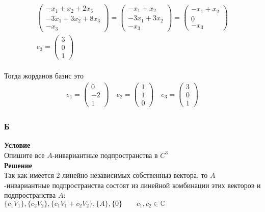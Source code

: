 \begin{gather*}
			\begin{pmatrix}
				-x_1 + x_2 + 2x_3\\
				-3x_1 + 3x_2 + 8x_3\\
				-x_3
			\end{pmatrix}
			= 
			\begin{pmatrix}
				-x_1 + x_2\\
				-3x_1 + 3x_2\\
				-x_3
			\end{pmatrix}
			= 
			\begin{pmatrix}
				-x_1 + x_2\\
				0\\
				-x_3
			\end{pmatrix}
			\\
			e_3 = 
			\begin{pmatrix}
				3 \\ 0 \\ 1
			\end{pmatrix}
		\end{gather*}
		\\
		Тогда жорданов базис это
		\begin{gather*}
			e_1 = 
			\begin{pmatrix}
				0 \\ -2 \\ 1
			\end{pmatrix}
			\quad
			e_2 = 
			\begin{pmatrix}
				1 \\ 1 \\ 0
			\end{pmatrix}
			\quad
			e_3 = 
			\begin{pmatrix}
				3 \\ 0 \\ 1
			\end{pmatrix}
		\end{gather*}
		
		\subsubsection*{\textbf{Б}}
		\textbf{Условие}\\
		 Опишите все $A$-инвариантные подпространства в $C^3$
		\\
		\textbf{Решение}\\
		Так как имеется 2 линейно независимых собственныз вектора, то $A$-инвариантные подпространства состоят из линейной комбинации этих векторов и подпространства $A$:\\
		$\{c_1 V_1\}, \{c_2 V_2\}, \{c_1 V_1 + c_2 V_2\}, \{A\}, \{0\}\qquad c_1,c_2 \in \mathbb{C}$
		\\
		
